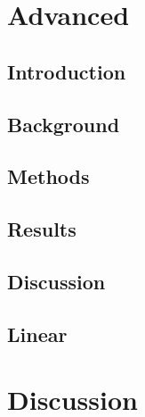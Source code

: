 \documentclass[letterpaper,10pt,english]{jupyterBook}
\begin{document}
\chapter{Advanced}
\label{\detokenize{content/chapter_06_advanced/abstract:advanced}}\label{\detokenize{content/chapter_06_advanced/abstract::doc}}

\section{Introduction}
\label{\detokenize{content/chapter_06_advanced/section01_introduction:introduction}}\label{\detokenize{content/chapter_06_advanced/section01_introduction::doc}}

\section{Background}
\label{\detokenize{content/chapter_06_advanced/section02_background:background}}\label{\detokenize{content/chapter_06_advanced/section02_background::doc}}

\section{Methods}
\label{\detokenize{content/chapter_06_advanced/section03_methods:methods}}\label{\detokenize{content/chapter_06_advanced/section03_methods::doc}}

\section{Results}
\label{\detokenize{content/chapter_06_advanced/section04_results:results}}\label{\detokenize{content/chapter_06_advanced/section04_results::doc}}

\section{Discussion}
\label{\detokenize{content/chapter_06_advanced/section05_discussion:discussion}}\label{\detokenize{content/chapter_06_advanced/section05_discussion::doc}}

\section{Linear}
\label{\detokenize{content/chapter_06_advanced/conclusion:linear}}\label{\detokenize{content/chapter_06_advanced/conclusion::doc}}

\chapter{Discussion}
\label{\detokenize{content/chapter_07_discussion/main:discussion}}\label{\detokenize{content/chapter_07_discussion/main::doc}}
\end{document}
